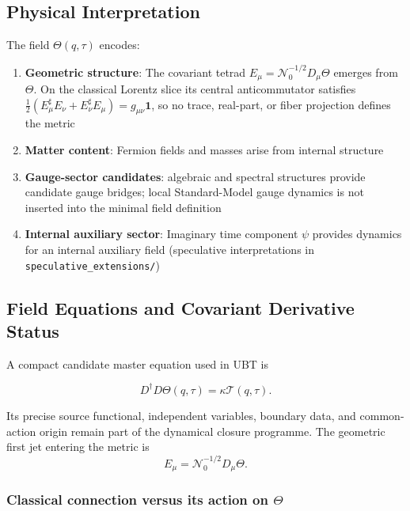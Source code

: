\subsection{Physical Interpretation}

The field $\Theta(q,\tau)$ encodes:

\begin{enumerate}
    \item \textbf{Geometric structure}: The covariant tetrad $E_\mu=\mathcal N_0^{-1/2}D_\mu\Theta$ emerges from $\Theta$.  On the classical Lorentz slice its central anticommutator satisfies $\tfrac12(E_\mu^\sharp E_\nu+E_\nu^\sharp E_\mu)=g_{\mu\nu}\mathbf1$, so no trace, real-part, or fiber projection defines the metric
    
    \item \textbf{Matter content}: Fermion fields and masses arise from internal structure
    
    \item \textbf{Gauge-sector candidates}: algebraic and spectral structures provide candidate gauge bridges; local Standard-Model gauge dynamics is not inserted into the minimal field definition
    
    \item \textbf{Internal auxiliary sector}: Imaginary time component $\psi$ provides dynamics for an internal auxiliary field (speculative interpretations in \texttt{speculative\_extensions/})
\end{enumerate}

\subsection{Field Equations and Covariant Derivative Status}

A compact candidate master equation used in UBT is

\begin{equation}
\label{eq:canonical:theta_equation}
D^\dagger D\Theta(q,\tau)=\kappa\mathcal T(q,\tau).
\end{equation}

Its precise source functional, independent variables, boundary data, and
common-action origin remain part of the dynamical closure programme.  The
geometric first jet entering the metric is
\begin{equation}
 E_\mu=\mathcal N_0^{-1/2}D_\mu\Theta.
\end{equation}

\subsubsection{Classical connection versus its action on $\Theta$}

